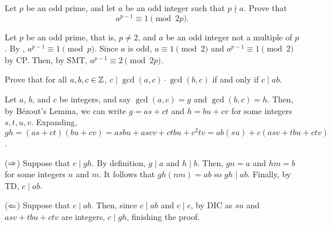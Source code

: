\begin{prob}
  Let $p$ be an odd prime, and let $a$ be an odd integer such that $p \nmid a$.
  Prove that \[ a^{p-1} \equiv 1 \pmod{2p}. \]
\end{prob}
\begin{prf}
  Let $p$ be an odd prime, that is, $p \neq 2$, and $a$ be an odd integer not a multiple of $p$.
  By \FLT, $a^{p-1} \equiv 1 \pmod p$.
  Since $a$ is odd, $a \equiv 1 \pmod 2$ and $a^{p-1} \equiv 1 \pmod 2$ by CP\@.
  Then, by SMT, $a^{p-1} \equiv 2 \pmod{2p}$.
\end{prf}

\begin{prob}
  Prove that for all $a,b,c \in \mathbb{Z}$, $c \mid \gcd(a,c) \cdot \gcd(b,c)$ if and only if $c \mid ab$.
\end{prob}
\begin{prf}
  Let $a$, $b$, and $c$ be integers, and say $\gcd(a,c) = g$ and $\gcd(b,c) = h$.
  Then, by Bézout's Lemma, we can write $g = as + ct$ and $h = bu + cv$ for some integers $s,t,u,v$.
  Expanding, $gh = (as + ct)(bu + cv) = asbu + ascv + ctbu + c^2tv = ab(su) + c(asv+tbu+ctv)$.

  ($\Rightarrow$) Suppose that $c \mid gh$.
  By definition, $g \mid a$ and $h \mid b$.
  Then, $gn = a$ and $hm = b$ for some integers $n$ and $m$.
  It follows that $gh(nm) = ab$ so $gh \mid ab$.
  Finally, by TD, $c \mid ab$.

  ($\Leftarrow$) Suppose that $c \mid ab$.
  Then, since $c \mid ab$ and $c \mid c$, by DIC as $su$ and $asv+tbu+ctv$ are integers, $c \mid gh$,
  finishing the proof.
\end{prf}

